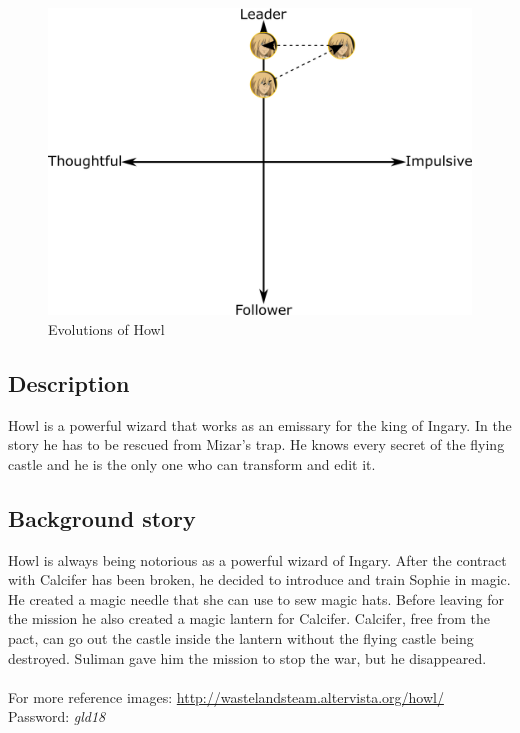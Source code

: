 \begin{figure}[H]
  \centering
  \includegraphics[width=14cm]{Images/Diagrams/Evolutions/howlEvolution}
  \caption{Evolutions of Howl}
\end{figure}


\subsection{Description}
Howl is a powerful wizard that works as an emissary for the king of Ingary. In the story he has to be rescued from Mizar's trap. He knows every secret of the flying castle and he is the only one who can transform and edit it.

\subsection{Background story}
Howl is always being notorious as a powerful wizard of Ingary. After the contract with Calcifer has been broken, he decided to introduce and train Sophie in magic. He created a magic needle that she can use to sew magic hats. Before leaving for the mission he also created a magic lantern for Calcifer. Calcifer, free from the pact, can go out the castle inside the lantern without the flying castle being destroyed. Suliman gave him the mission to stop the war, but he disappeared.
\\\\
For more reference images: \url{http://wastelandsteam.altervista.org/howl/}\\
Password: \textit{gld18}
